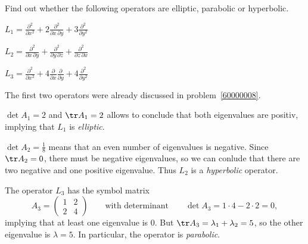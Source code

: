 Find out whether the following operators are elliptic, parabolic or
hyperbolic.
\begin{teilaufgaben}
\item
$
\displaystyle
L_1
=
\frac{\partial^2}{\partial x^2}
+
2\frac{\partial^2}{\partial x\,\partial y}
+
3\frac{\partial^2}{\partial y^2}
$
\item
$
\displaystyle
L_2
=
\frac{\partial^2}{\partial x\,\partial y}
+
\frac{\partial^2}{\partial y\,\partial z}
+
\frac{\partial^2}{\partial z\,\partial x}
$
\item
$
\displaystyle
L_3
=
\frac{\partial^2}{\partial x^2}
+
4\frac{\partial }{\partial x}\frac{\partial }{\partial y}
+
4\frac{\partial^2}{\partial y^2}
$
\end{teilaufgaben}

\begin{loesung}
The first two operators were already discussed in problem~\ref{60000008}.
\begin{teilaufgaben}
\item 
$\det A_1 = 2$ and $\tr A_1=2$ allows to conclude that both eigenvalues
are positiv, implying that $L_1$ is {\em elliptic}.
\item
$\det A_2 = \frac18$ means that an even number of
eigenvalues is negative.
Since $\tr A_2=0$, there must be negative eigenvalues, so we can conlude
that there are two negative and one positive eigenvalue.
Thus $L_2$ is a {\em hyperbolic} operator.
\item
The operator $L_3$ has the symbol matrix
\[
A_3
=
\begin{pmatrix}
1&2\\
2&4
\end{pmatrix}
\qquad
\text{with determinant}
\qquad
\det A_3
=
1\cdot 4 - 2\cdot 2
=
0,
\]
implying that at least one eigenvalue is $0$.
But $\tr A_3 =\lambda_1+\lambda_2 = 5$, so the other eigenvalue is
$\lambda=5$.
In particular, the operator is {\em parabolic}.
\qedhere
\end{teilaufgaben}
\end{loesung}
